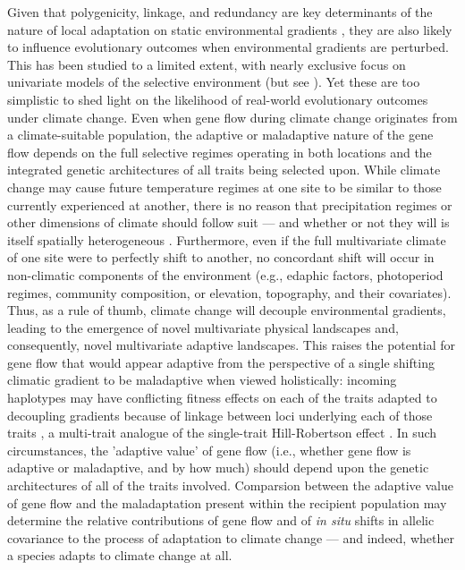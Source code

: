 \documentclass[9pt,twocolumn,twoside,lineno]{pnas-new}
\begin{document}
Given that polygenicity, linkage, and redundancy
are key determinants of the nature of local adaptation
on static environmental gradients \cite{barton,yeaman_whitlock,yeaman_review,lecorre},
they are also likely to influence evolutionary
outcomes when environmental gradients are perturbed.
This has been studied to a limited extent,
with nearly exclusive focus on univariate models
of the selective environment (but see \cite{schiffers}).
Yet these are too simplistic to
shed light on the likelihood of
real-world evolutionary outcomes
under climate change.
Even when gene flow during climate change originates from a climate-suitable population,
the adaptive or maladaptive nature 
of the gene flow depends on the full selective regimes operating in both locations
and the integrated genetic architectures of all traits being selected upon.
While climate change may cause 
future temperature regimes at one site to be similar to those currently 
experienced at another, there is no reason that precipitation regimes or other
dimensions of climate should follow suit --- and whether or not they will is
itself spatially heterogeneous \cite{crimmins,daly}.
Furthermore, even if the full multivariate climate of one site were to 
perfectly shift to another, no concordant shift will occur in
non-climatic components of the environment (e.g., edaphic factors, photoperiod 
regimes, community composition, or elevation, topography, and their covariates). 
Thus, as a rule of thumb, climate change will 
decouple environmental gradients, 
leading to the emergence of novel multivariate physical landscapes
\cite{williams_novel_climates,williams_projected_novel_disappearing,fitzpatrick_climate_novelty_forecasts}
and, consequently, novel multivariate adaptive landscapes.
This raises the potential for gene flow that would appear adaptive
from the perspective of a single shifting climatic gradient
to be maladaptive when viewed holistically: 
incoming haplotypes may have conflicting fitness effects on each of the traits
adapted to decoupling gradients
because of linkage between loci underlying each of those traits \cite{aitken_whitlock,schiffers},
a multi-trait analogue of the single-trait Hill-Robertson effect \cite{hill_robertson}. 
In such circumstances, the 'adaptive value' of gene flow (i.e., whether gene flow
is adaptive or maladaptive, and by how much) should depend 
upon the genetic architectures of all of the traits involved.
Comparsion between the adaptive value of gene flow
and the maladaptation present within the recipient population
may determine the relative contributions of gene flow
and of \textit{in situ} shifts in allelic covariance
to the process of adaptation to climate change --- and indeed,
whether a species adapts to climate change at all.
\end{document}
